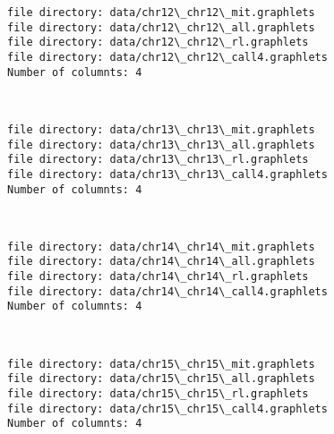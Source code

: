 \documentclass[11pt]{article}
\begin{document}
    \begin{Verbatim}[commandchars=\\\{\}]
file directory: data/chr12\_chr12\_mit.graphlets
file directory: data/chr12\_chr12\_all.graphlets
file directory: data/chr12\_chr12\_rl.graphlets
file directory: data/chr12\_chr12\_call4.graphlets
Number of columnts: 4

    \end{Verbatim}

    \begin{center}
    \end{center}
    { \hspace*{\fill} \\}
    
    \begin{Verbatim}[commandchars=\\\{\}]
file directory: data/chr13\_chr13\_mit.graphlets
file directory: data/chr13\_chr13\_all.graphlets
file directory: data/chr13\_chr13\_rl.graphlets
file directory: data/chr13\_chr13\_call4.graphlets
Number of columnts: 4

    \end{Verbatim}

    \begin{center}
    \end{center}
    { \hspace*{\fill} \\}
    
    \begin{Verbatim}[commandchars=\\\{\}]
file directory: data/chr14\_chr14\_mit.graphlets
file directory: data/chr14\_chr14\_all.graphlets
file directory: data/chr14\_chr14\_rl.graphlets
file directory: data/chr14\_chr14\_call4.graphlets
Number of columnts: 4

    \end{Verbatim}

    \begin{center}
    \end{center}
    { \hspace*{\fill} \\}
    
    \begin{Verbatim}[commandchars=\\\{\}]
file directory: data/chr15\_chr15\_mit.graphlets
file directory: data/chr15\_chr15\_all.graphlets
file directory: data/chr15\_chr15\_rl.graphlets
file directory: data/chr15\_chr15\_call4.graphlets
Number of columnts: 4

    \end{Verbatim}
\end{document}

